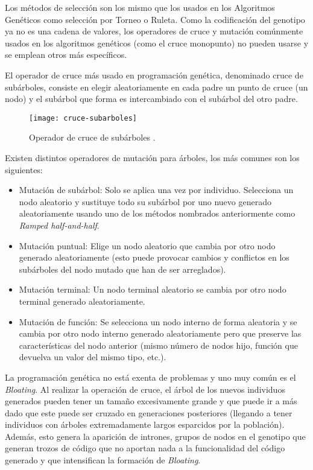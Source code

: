 Los métodos de selección son los mismo que los usados en los Algoritmos Genéticos como selección por Torneo o Ruleta.
Como la codificación del genotipo ya no es una cadena de valores, los operadores de cruce y mutación comúnmente usados en los algoritmos genéticos (como el cruce monopunto) no pueden usarse y se emplean otros más específicos.

\blankline

El operador de cruce más usado en programación genética, denominado cruce de subárboles, consiste en elegir aleatoriamente en cada padre un punto de cruce (un nodo) y el subárbol que forma es intercambiado con el subárbol del otro padre.

\begin{figure}[H]
\centering
\texttt{[image: cruce-subarboles]}
\caption{Operador de cruce de subárboles \cite{tsang2000eddie}.}
\end{figure}

Existen distintos operadores de mutación para árboles, los más comunes son los siguientes:
\begin{itemize}
\item Mutación de subárbol: Solo se aplica una vez por individuo. Selecciona un nodo aleatorio y sustituye todo su subárbol por uno nuevo generado aleatoriamente usando uno de los métodos nombrados anteriormente como \textit{Ramped half-and-half}.

\item Mutación puntual: Elige un nodo aleatorio que cambia por otro nodo generado aleatoriamente (esto puede provocar cambios y conflictos en los subárboles del nodo mutado que han de ser arreglados).

\item Mutación terminal: Un nodo terminal aleatorio se cambia por otro nodo terminal generado aleatoriamente.

\item Mutación de función: Se selecciona un nodo interno de forma aleatoria y se cambia por otro nodo interno generado aleatoriamente pero que preserve las características del nodo anterior (mismo número de nodos hijo, función que devuelva un valor del mismo tipo, etc.).
\end{itemize}

La programación genética no está exenta de problemas y uno muy común es el \textit{Bloating}. Al realizar la operación de cruce, el árbol de los nuevos individuos generados pueden tener un tamaño excesivamente grande y que puede ir a más dado que este puede ser cruzado en generaciones posteriores (llegando a tener individuos con árboles extremadamente largos esparcidos por la población). Además, esto genera la aparición de intrones, grupos de nodos en el genotipo que generan trozos de código que no aportan nada a la funcionalidad del código generado y que intensifican la formación de \textit{Bloating}.

